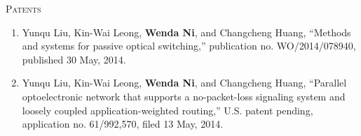 \documentclass[letterpaper,11pt]{article}
\newcommand{\resheading}[1]{{\noindent\large \colorbox{mygrey}{
\begin{minipage}{1.0\textwidth}{\textsc{#1 \vphantom{p\^{E}}}}\end{minipage}}}}
\begin{document}
\resheading{Patents}%
\begin{enumerate}
\item
Yunqu Liu, Kin-Wai Leong, \textbf{Wenda Ni}, and Changcheng Huang, ``Methods and systems for passive optical switching,'' publication no. WO/2014/078940, published 30 May, 2014.

\item
Yunqu Liu, Kin-Wai Leong, \textbf{Wenda Ni}, and Changcheng Huang, ``Parallel optoelectronic network that supports a no-packet-loss signaling system and loosely coupled application-weighted routing,'' U.S. patent pending, application no. 61/992,570, filed 13 May, 2014.
\end{enumerate}
\end{document}
